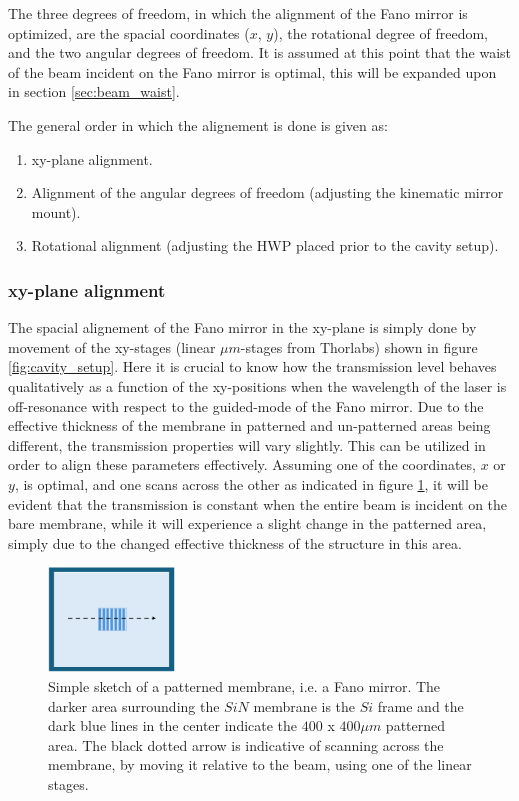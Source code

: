 The three degrees of freedom, in which the alignment of the Fano mirror is optimized, are the spacial coordinates ($x$, $y$), the rotational degree of freedom, and the two angular degrees of freedom. It is assumed at this point that the waist of the beam incident on the Fano mirror is optimal, this will be expanded upon in section \ref{sec:beam_waist}.

The general order in which the alignement is done is given as:
\begin{enumerate}
    \item xy-plane alignment. 
    \item Alignment of the angular degrees of freedom (adjusting the kinematic mirror mount).
    \item Rotational alignment (adjusting the HWP placed prior to the cavity setup).
\end{enumerate}

\subsubsection*{xy-plane alignment}
The spacial alignement of the Fano mirror in the xy-plane is simply done by movement of the xy-stages (linear $\mu m$-stages from Thorlabs) shown in figure \ref{fig:cavity_setup}. Here it is crucial to know how the transmission level behaves qualitatively as a function of the xy-positions when the wavelength of the laser is off-resonance with respect to the guided-mode of the Fano mirror. Due to the effective thickness of the membrane in patterned and un-patterned areas being different, the transmission properties will vary slightly. This can be utilized in order to align these parameters effectively. Assuming one of the coordinates, $x$ or $y$, is optimal, and one scans across the other as indicated in figure \ref{fig:xy_alignment_sketch}, it will be evident that the transmission is constant when the entire beam is incident on the bare membrane, while it will experience a slight change in the patterned area, simply due to the changed effective thickness of the structure in this area. 

\begin{figure}[h!]
    \centering 
    \includegraphics[width=0.3\textwidth]{figures/xy_alignment_sketch.pdf}
    \caption{Simple sketch of a patterned membrane, i.e. a Fano mirror. The darker area surrounding the $SiN$ membrane is the $Si$ frame and the dark blue lines in the center indicate the $400$ x $400 \mu m$ patterned area. The black dotted arrow is indicative of scanning across the membrane, by moving it relative to the beam, using one of the linear stages.}
    \label{fig:xy_alignment_sketch}
\end{figure}

